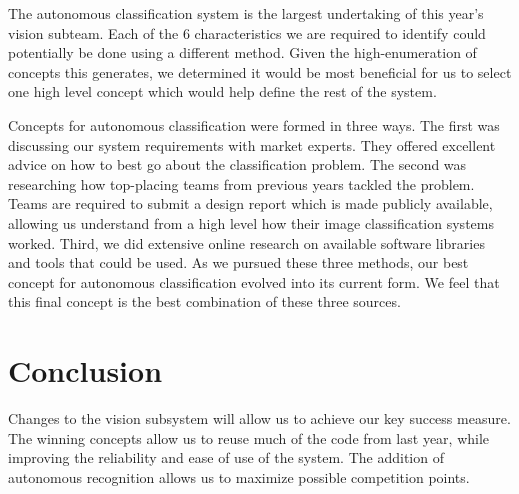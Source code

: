 \documentclass[]{auvsi_doc}
\begin{document}
The autonomous classification system is the largest undertaking of this year's vision subteam. Each of the 6 characteristics we are
required to identify could potentially be done using a different method. Given the high-enumeration of concepts this generates, we
determined it would be most beneficial for us to select one high level concept which would help define the rest of the system.

Concepts for autonomous classification were formed in three ways. The first was discussing our system requirements with market experts.
They offered excellent advice on how to best go about the classification problem. The second was researching how top-placing teams from
previous years tackled the problem. Teams are required to submit a design report which is made publicly available, allowing us understand
from a high level how their image classification systems worked. Third, we did extensive online research on available software libraries
and tools that could be used. As we pursued these three methods, our best concept for autonomous classification evolved into its current
form. We feel that this final concept is the best combination of these three sources.

\section{Conclusion}

Changes to the vision subsystem will allow us to achieve our key success measure. The winning concepts allow us to reuse much of the
code from last year, while improving the reliability and ease of use of the system. The addition of autonomous recognition allows
us to maximize possible competition points.
\end{document}

